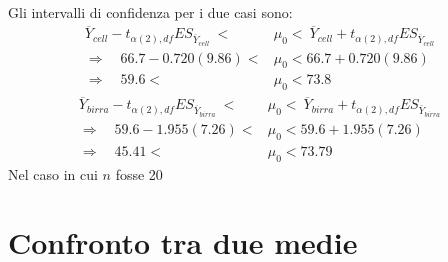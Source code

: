 \documentclass[10pt, draft]{book}
\newcounter{example}[section]
\begin{document}
\begin{example}
    \\
    Gli intervalli di confidenza per i due casi sono:
    \begin{align}
        \overline{Y}_{cell}-t_{\alpha(2),df}ES_{\overline{Y}_{cell}}\ < &\mu_0 <\ \overline{Y}_{cell}+t_{\alpha(2),df}ES_{\overline{Y}_{cell}}
        \\
        \Rightarrow \quad 66.7-0.720(9.86)<&\mu_0<66.7+0.720(9.86)
        \\
        \Rightarrow \quad 59.6<&\mu_0<73.8
    \end{align}
    \begin{align}
        \overline{Y}_{birra}-t_{\alpha(2),df}ES_{\overline{Y}_{birra}}\ < &\mu_0 <\ \overline{Y}_{birra}+t_{\alpha(2),df}ES_{\overline{Y}_{birra}}
        \\
        \Rightarrow \quad 59.6-1.955(7.26)<&\mu_0<59.6+1.955(7.26)
        \\
        \Rightarrow \quad 45.41<&\mu_0<73.79
    \end{align}
    Nel caso in cui $n$ \colorbox{lyellow}{fosse 20}
\end{example}

\chapter{Confronto tra due medie}
\end{document}

